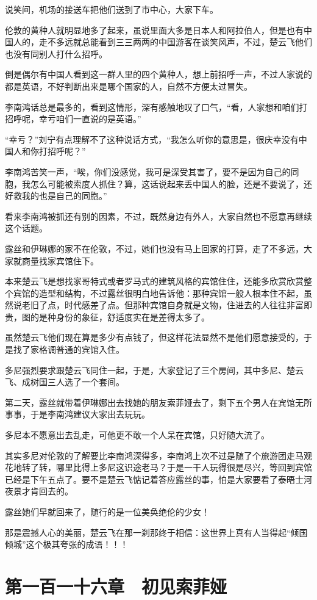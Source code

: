 说笑间，机场的接送车把他们送到了市中心，大家下车。

伦敦的黄种人就明显地多了起来，虽说里面大多是日本人和阿拉伯人，但是也有中国人的，走不多远就总能看到三三两两的中国游客在谈笑风声，不过，楚云飞他们也没有同别人打什么招呼。

倒是偶尔有中国人看到这一群人里的四个黄种人，想上前招呼一声，不过人家说的都是英语，不好判断出来是哪个国家的人，自然不方便太过冒失。

李南鸿话总是最多的，看到这情形，深有感触地叹了口气，“看，人家想和咱们打招呼呢，幸亏咱们一直说的是英语。”

“幸亏？”刘宁有点理解不了这种说话方式，“我怎么听你的意思是，很庆幸没有中国人和你打招呼呢？”

李南鸿苦笑一声，“唉，你们没感觉，我可是深受其害了，要不是因为自己的同胞，我怎么可能被索度人抓住？算，这话说起来丢中国人的脸，还是不要说了，还好救我的也是自己的同胞。”

看来李南鸿被抓还有别的因素，不过，既然身边有外人，大家自然也不愿意再继续这个话题。

露丝和伊琳娜的家不在伦敦，不过，她们也没有马上回家的打算，走了不多远，大家就商量找家宾馆住下。

本来楚云飞是想找家哥特式或者罗马式的建筑风格的宾馆住住，还能多欣赏欣赏整个宾馆的造型和结构，不过露丝很明白地告诉他：那种宾馆一般人根本住不起，虽然说老旧了点，时代感差了点。但那种宾馆自身就是文物，住进去的人往往非富即贵，图的是种身份的象征，舒适度实在是差得太多了。

虽然楚云飞他们现在算是多少有点钱了，但这样花法显然不是他们愿意接受的，于是找了家格调普通的宾馆入住。

多尼强烈要求跟楚云飞同住一起，于是，大家登记了三个房间，其中多尼、楚云飞、成树国三人选了一个套间。

第二天，露丝就带着伊琳娜出去找她的朋友索菲娅去了，剩下五个男人在宾馆无所事事，于是李南鸿建议大家出去玩玩。

多尼本不愿意出去乱走，可他更不敢一个人呆在宾馆，只好随大流了。

其实多尼对伦敦的了解要比李南鸿深得多，李南鸿上次不过是随了个旅游团走马观花地转了转，哪里比得上多尼这识途老马？于是一干人玩得很是尽兴，等回到宾馆已经是下午五点了。要不是楚云飞惦记着答应露丝的事，怕是大家要看了泰晤士河夜景才肯回去的。

露丝她们早就回来了，随行的是一位美奂绝伦的少女！

那是震撼人心的美丽，楚云飞在那一刹那终于相信：这世界上真有人当得起“倾国倾城”这个极其夸张的成语！！！

\section{第一百一十六章　初见索菲娅}

